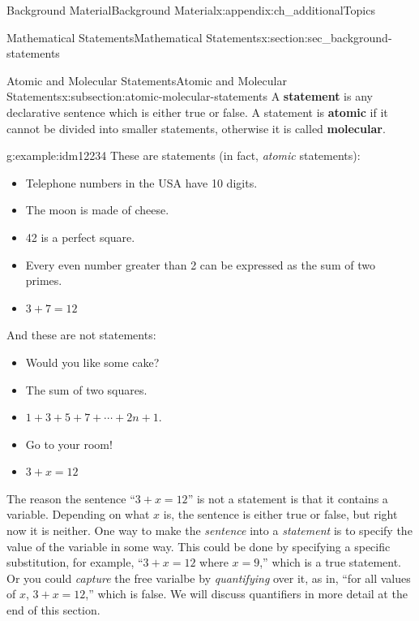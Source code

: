 \documentclass[oneside,10pt,]{book}
\newcommand{\terminology}[1]{\textbf{#1}}
\numberwithin{equation}{chapter}
\begin{document}
\begin{appendixptx}{Background Material}{}{Background Material}{}{}{x:appendix:ch_additionalTopics}
\begin{sectionptx}{Mathematical Statements}{}{Mathematical Statements}{}{}{x:section:sec_background-statements}
\begin{introduction}{}
\end{introduction}%
%
%
\typeout{************************************************}
\typeout{************************************************}
%
\begin{subsectionptx}{Atomic and Molecular Statements}{}{Atomic and Molecular Statements}{}{}{x:subsection:atomic-molecular-statements}
A \terminology{statement} is any declarative sentence which is either true or false. A statement is \terminology{atomic} if it cannot be divided into smaller statements, otherwise it is called \terminology{molecular}.%
\begin{example}{}{g:example:idm12234}%
These are statements (in fact, \emph{atomic} statements):%
\begin{itemize}[label=\textbullet]
\item{}Telephone numbers in the USA have 10 digits.%
\item{}The moon is made of cheese.%
\item{}42 is a perfect square.%
\item{}Every even number greater than 2 can be expressed as the sum of two primes.%
\item{}\(3+7 = 12\)%
\end{itemize}
And these are not statements:%
\begin{itemize}[label=\textbullet]
\item{}Would you like some cake?%
\item{}The sum of two squares.%
\item{}\(1+3+5+7+\cdots+2n+1\).%
\item{}Go to your room!%
\item{}\(3+x = 12\)%
\end{itemize}
%
\end{example}
The reason the sentence ``\(3 + x = 12\)'' is not a statement is that it contains a variable. Depending on what \(x\) is, the sentence is either true or false, but right now it is neither. One way to make the \emph{sentence} into a \emph{statement} is to specify the value of the variable in some way. This could be done by specifying a specific substitution, for example, ``\(3+x = 12\) where \(x = 9\),'' which is a true statement.  Or you could \emph{capture} the free varialbe by \emph{quantifying} over it, as in, ``for all values of \(x\), \(3+x = 12\),'' which is false. We will discuss quantifiers in more detail at the end of this section.%
\par

\end{subsectionptx}
\end{sectionptx}
\end{appendixptx}
\end{document}
